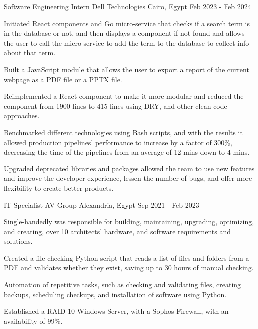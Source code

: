 \begin{cventries}
  \cventry
   {Software Engineering Intern} %
    {Dell Technologies} %
    {Cairo, Egypt} %
    {Feb 2023 - Feb 2024} %
    {
      \begin{cvitems} %
        \item {Initiated React components and Go micro-service that checks if a search term is in the database or not, and then displays a component if not found and allows the user to call the micro-service to add the term to the database to collect info about that term.}
        \item {Built a JavaScript module that allows the user to export a report of the current webpage as a PDF file or a PPTX file.}
        \item {Reimplemented a React component to make it more modular and reduced the component from 1900 lines to 415 lines using DRY, and other clean code approaches.}
        \item{Benchmarked different technologies using Bash scripts, and with the results it allowed production pipelines’ performance to increase by a factor of 300\%, decreasing the time of the pipelines from an average of 12 mins down to 4 mins.}
        \item{Upgraded deprecated libraries and packages allowed the team to use new features and improve the developer experience, lessen the number of bugs, and offer more flexibility to create better products.}
      \end{cvitems}
    }
    
     \cventry
    {IT Specialist} %
    {AV Group} %
    {Alexandria, Egypt} %
    {Sep 2021 - Feb 2023} %
    {
      \begin{cvitems} %
      \item{Single-handedly was responsible for building, maintaining, upgrading, optimizing, and creating, over 10 architects' hardware, and software requirements and solutions.}
        \item {Created a file-checking Python script that reads a list of files and folders from a PDF and validates whether they exist, saving up to 30 hours of manual checking.}
        \item {Automation of repetitive tasks, such as checking and validating files, creating backups, scheduling checkups, and installation of software using Python.}
        \item {Established a RAID 10 Windows Server, with a Sophos Firewall, with an availability of 99\%.}
      \end{cvitems}
    }
    

\end{cventries}
